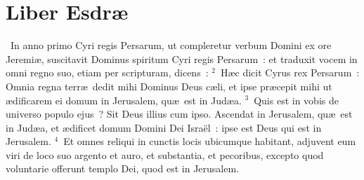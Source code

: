 \clearpage
{\centering \section*{Liber Esdræ}}\thispagestyle{empty}

~In anno primo Cyri regis Persarum, ut compleretur verbum Domini ex ore Jeremi\ae , suscitavit Dominus spiritum Cyri regis Persarum~: et traduxit vocem in omni regno suo, etiam per scripturam, dicens~:
${}^{2}$~H\ae c dicit Cyrus rex Persarum~: Omnia regna terr\ae\ dedit mihi Dominus Deus c\ae li, et ipse pr\ae cepit mihi ut \ae dificarem ei domum in Jerusalem, qu\ae\ est in Jud\ae a.
${}^{3}$~Quis est in vobis de universo populo ejus~? Sit Deus illius cum ipso. Ascendat in Jerusalem, qu\ae\ est in Jud\ae a, et \ae dificet domum Domini Dei Isra\"el~: ipse est Deus qui est in Jerusalem.
${}^{4}$~Et omnes reliqui in cunctis locis ubicumque habitant, adjuvent eum viri de loco suo argento et auro, et substantia, et pecoribus, excepto quod voluntarie offerunt templo Dei, quod est in Jerusalem.


